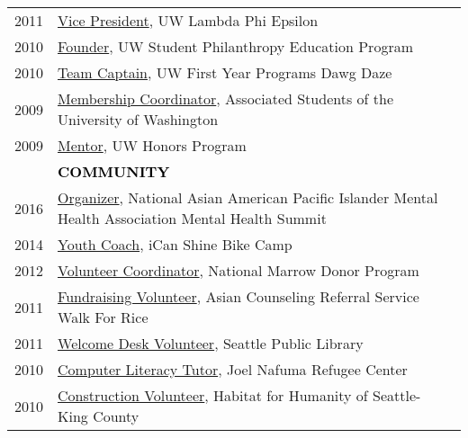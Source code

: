 \documentclass[11pt]{article}
\begin{document}
{{\begin{longtable}{Rp{0.75in}p{5.0in}}
\footnotesize{2011} & \href{https://www.dailyuw.com/features/article_107d7a3a-3bec-5989-b8ae-56bd4afd0c89.html}{Vice President}, UW Lambda Phi Epsilon\\

\footnotesize{2010} & \href{https://www.washington.edu/giving/get-involved/for-students/real-dawgs-give-back/}{Founder}, UW Student Philanthropy Education Program\\

\footnotesize{2010} & \href{http://www.uwdawgdaze.com/}{Team Captain}, UW First Year Programs Dawg Daze\\

\footnotesize{2009} & \href{https://www.dailyuw.com/news/article_05df45ba-6f0b-5612-964e-ab318f36b612.html}{Membership Coordinator}, Associated Students of the University of Washington\\

\footnotesize{2009} & \href{https://honors.uw.edu/community/grads/12_13/}{Mentor}, UW Honors Program\\

& \textcolor{black}{\uppercase{\textbf{Community}}}\\

\footnotesize{2016} & \href{https://www.facebook.com/events/215634702135825/}{Organizer}, National Asian American Pacific Islander Mental Health Association Mental Health Summit\\

\footnotesize{2014} & \href{https://icanshine.org/}{Youth Coach}, iCan Shine Bike Camp\\

\footnotesize{2012} & \href{http://www.dailyuw.com/news/article_de3524ce-3d5e-5dd2-8de7-5deebee463d9.html}{Volunteer Coordinator}, National Marrow Donor Program\\

\footnotesize{2011} & \href{https://acrs.org/events/walk-for-rice/}{Fundraising Volunteer}, Asian Counseling Referral Service Walk For Rice\\

\footnotesize{2011} & \href{https://www.spl.org}{Welcome Desk Volunteer}, Seattle Public Library\\

\footnotesize{2010} & \href{https://www.habitatskc.org/}{Computer Literacy Tutor}, Joel Nafuma Refugee Center\\

\footnotesize{2010} & \href{https://www.habitatskc.org/}{Construction Volunteer}, Habitat for Humanity of Seattle-King County\\


\end{longtable}}}
\end{document}
